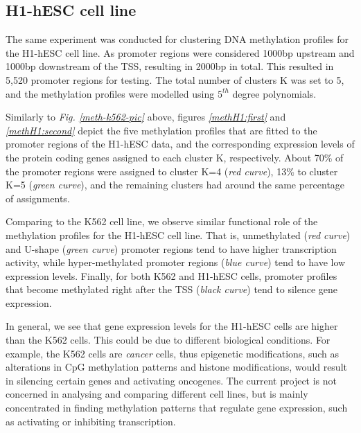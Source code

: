 \subsection{H1-hESC cell line} \label{meth-encode-h1-subsect}
The same experiment was conducted for clustering DNA methylation profiles for the H1-hESC cell line. As promoter regions were considered 1000bp upstream and 1000bp downstream of the TSS, resulting in 2000bp in total. This resulted in 5,520 promoter regions for testing. The total number of clusters K was set to 5, and the methylation profiles were modelled using $5^{th}$ degree polynomials. 

Similarly to \emph{Fig. \ref{meth-k562-pic}} above, figures \emph{\ref{methH1:first}} and \emph{\ref{methH1:second}} depict the five methylation profiles that are fitted to the promoter regions of the H1-hESC data, and the corresponding expression levels of the protein coding genes assigned to each cluster K, respectively. About 70\% of the promoter regions were assigned to cluster K=4 (\emph{red curve}), 13\% to cluster K=5 (\emph{green curve}), and the remaining clusters had around the same percentage of assignments. 

Comparing to the K562 cell line, we observe similar functional role of the methylation profiles for the H1-hESC cell line. That is, unmethylated (\emph{red curve}) and U-shape (\emph{green curve}) promoter regions tend to have higher transcription activity, while hyper-methylated promoter regions (\emph{blue curve}) tend to have low expression levels. Finally, for both K562 and H1-hESC cells, promoter profiles that become methylated right after the TSS (\emph{black curve}) tend to silence gene expression. 

In general, we see that gene expression levels for the H1-hESC cells are higher than the K562 cells. This could be due to different biological conditions. For example, the K562 cells are \emph{cancer} cells, thus epigenetic modifications, such as alterations in CpG methylation patterns and histone modifications, would result in silencing certain genes and activating oncogenes. The current project is not concerned in analysing and comparing different cell lines, but is mainly concentrated in finding methylation patterns that regulate gene expression, such as activating or inhibiting transcription. 

